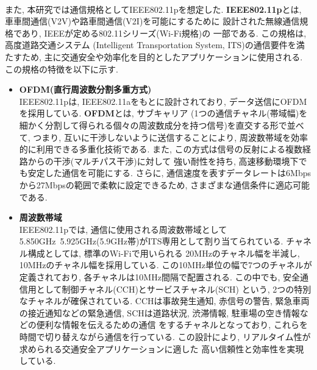 \\[1em]
\indent また, 本研究では通信規格としてIEEE802.11pを想定した. 
\textbf{IEEE802.11p}とは, 車車間通信(V2V)や路車間通信(V2I)を可能にするために
設計された無線通信規格であり, IEEEが定める802.11シリーズ(Wi-Fi規格)の
一部である. この規格は, 高度道路交通システム
(Intelligent Transportation System, ITS)の通信要件を満たすため, 
主に交通安全や効率化を目的としたアプリケーションに使用される.\\
\indent この規格の特徴を以下に示す. 
\begin{itemize}
  \item \textbf{OFDM(直行周波数分割多重方式)}\\
  \indent IEEE802.11pは, IEEE802.11aをもとに設計されており, 
  データ送信にOFDMを採用している. \textbf{OFDM}とは, サブキャリア
  (1つの通信チャネル(帯域幅)を細かく分割して得られる個々の周波数成分を持つ信号)を直交する形で並べて, 
  つまり, 互いに干渉しないように送信することにより, 周波数帯域を効率的に利用できる多重化技術である. 
  また, この方式は信号の反射による複数経路からの干渉(マルチパス干渉)に対して
  強い耐性を持ち, 高速移動環境下でも安定した通信を可能にする. さらに, 
  通信速度を表すデータレートは6Mbpsから27Mbpsの範囲で柔軟に設定できるため, 
  さまざまな通信条件に適応可能である. 
  \item \textbf{周波数帯域}\\
  \indent IEEE802.11pでは, 通信に使用される周波数帯域として
  5.850GHz~5.925GHz(5.9GHz帯)がITS専用として割り当てられている. 
  チャネル構成としては, 標準のWi-Fiで用いられる
  20MHzのチャネル幅を半減し, 10MHzのチャネル幅を採用している. 
  この10MHz単位の幅で7つのチャネルが定義されており, 
  各チャネルは10MHz間隔で配置される. 
  この中でも, 安全通信用として制御チャネル(CCH)とサービスチャネル(SCH)
  という, 2つの特別なチャネルが確保されている. 
  CCHは事故発生通知, 赤信号の警告, 緊急車両の接近通知などの緊急通信, 
  SCHは道路状況, 渋滞情報, 駐車場の空き情報などの便利な情報を伝えるための通信
  をするチャネルとなっており,  これらを時間で切り替えながら通信を行っている. 
  この設計により, リアルタイム性が求められる交通安全アプリケーションに適した
  高い信頼性と効率性を実現している. 
\end{itemize}
